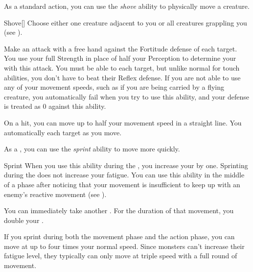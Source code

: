         \label{Shove} As a standard action, you can use the \textit{shove} ability to physically move a creature.

        \begin{activeability}{Shove}[]
            \rankline
            Choose either one creature adjacent to you or all creatures grappling you (see ).

            Make an attack with a free hand against the Fortitude defense of each target.
            You use your full Strength in place of half your Perception to determine your  with this attack.
            You must be able to  each target, but unlike normal for touch abilities, you don't have to beat their Reflex defense.
            If you are not able to use any of your movement speeds, such as if you are being carried by a flying creature, you automatically fail when you try to use this ability, and your defense is treated as 0 against this ability.

            On a hit, you can move up to half your movement speed in a straight line.
            You automatically  each target as you move.
        \end{activeability}

        \label{Sprint} As a , you can use the \textit{sprint} ability to move more quickly.

        \begin{activeability}{Sprint}
            \rankline
            When you use this ability during the , you increase your  by one.
            Sprinting during the  does not increase your fatigue.
            You can use this ability in the middle of a phase after noticing that your movement is insufficient to keep up with an enemy's reactive movement (see ).

            You can immediately take another .
            For the duration of that movement, you double your .
        \end{activeability}

        If you sprint during both the movement phase and the action phase, you can move at up to four times your normal speed.
        Since monsters can't increase their fatigue level, they typically can only move at triple speed with a full round of movement.

